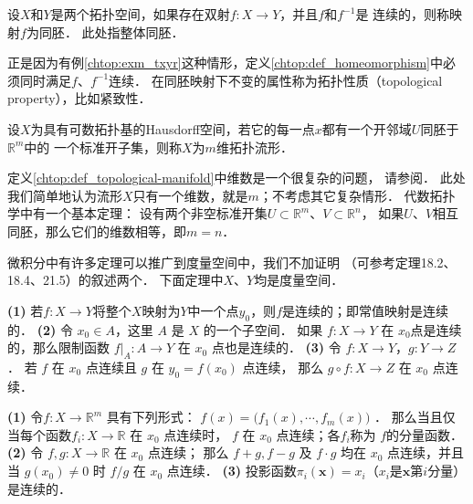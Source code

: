 \begin{definition}\label{chtop:def_homeomorphism}
    设$X$和$Y$是两个拓扑空间，如果存在双射$f:X\to Y$，并且$f$和$f^{-1}$是
    连续的，则称映射$f$为{\heiti 同胚}． 此处指整体同胚．  
\end{definition}

正是因为有例\ref{chtop:exm_txyr}这种情形，定义\ref{chtop:def_homeomorphism}中必须同时满足$f$、$f^{-1}$连续．
在同胚映射下不变的属性称为{\heiti 拓扑性质}（topological property），比如紧致性．


\begin{definition}\label{chtop:def_topological-manifold}
    设$X$为具有可数拓扑基的Hausdorff空间，若它的每一点$x$都有一个开邻域$U$同胚于$\mathbb{R}^m$中的
    一个标准开子集，则称$X$为$m$维{\heiti 拓扑流形}．
\end{definition}

定义\ref{chtop:def_topological-manifold}中{\kaishu 维数}是一个很复杂的问题，
请参阅\parencite[\S 50]{munkres-2000-topology}．
此处我们简单地认为流形$X$只有一个维数，就是$m$；不考虑其它复杂情形．
代数拓扑学中有一个基本定理：  %
设有两个非空标准开集$U\subset \mathbb{R}^m$、$V\subset \mathbb{R}^n$，
如果$U$、$V$相互同胚，那么它们的维数相等，即$m=n$．


微积分中有许多定理可以推广到度量空间中，我们不加证明
（可参考\parencite{munkres-2000-topology}定理18.2、18.4、21.5）的叙述两个．
下面定理中$X$、$Y$均是度量空间．

\begin{theorem}
    {\bfseries (1)} 若$f:X\to Y$将整个$X$映射为$Y$中一个点$y_0$，则$f$是连续的；即常值映射是连续的．
    {\bfseries (2)} 令 $x_0 \in A$，这里 $A$ 是 $X$ 的一个子空间．
    如果 $f: X \rightarrow Y$ 在 $x_0$点是连续的，那么限制函数 $\left.f\right|_A: A \rightarrow Y$
    在 $x_0$ 点也是连续的．
    {\bfseries (3)} 令 $f: X \rightarrow Y$，$g: Y \rightarrow Z$．
    若 $f$ 在 $x_0$ 点连续且 $g$ 在 $y_0=f\left(x_0\right)$ 点连续，
    那么 $g \circ f: X \rightarrow Z$ 在 $x_0$ 点连续．
\end{theorem}


\begin{theorem}
    {\bfseries (1)} 令$f: X \rightarrow \mathbb{R}^m$ 具有下列形式：
    $    f(x)=\bigl(f_1(x), \cdots, f_m(x)\bigr)     $    ．
    那么当且仅当每个函数$f_{i}: X \rightarrow \mathbb{R}$ 在 $x_0$ 点连续时，
    $f$ 在 $x_0$ 点连续；各$f_i$称为 $f$的分量函数．    
    {\bfseries (2)} 令 $f, g: X \rightarrow \mathbb{R}$ 在 $x_0$ 点连续；
    那么 $f+g, f-g$ 及 $f \cdot g$ 均在 $x_0$ 点连续，并且当 $g(x_0) \neq 0$ 时 $f / g$ 在 $x_0$ 点连续．
    {\bfseries (3)} 投影函数$\pi_i(\boldsymbol{x})=x_i$（$x_i$是$\boldsymbol{x}$第$i$分量）是连续的．
\end{theorem}










